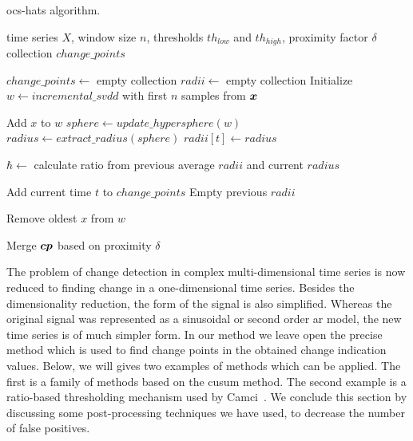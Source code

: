 \begin{algorithm}
\caption{\acrlong{ocs-hats} algorithm.}
\label{alg:ocs-hats}
\begin{algorithmic}[1]
\Require time series $X$, window size $n$, thresholds $th_{low}$ and $th_{high}$, proximity factor $\delta$
\Ensure collection $change\_points$
\item[]
\State $change\_points \leftarrow$ empty collection
\State $radii \leftarrow$ empty collection
\State Initialize $w \leftarrow incremental\_svdd$ with first $n$ samples from $\vectorsym{x}$
\item[]
  \item[]
  \State Add $x$ to $w$
  \State $sphere \leftarrow update\_hypersphere(w)$
  \State $radius \leftarrow extract\_radius(sphere)$
  \State $radii[t] \leftarrow radius$
  \item[]
  \State $\hbar \leftarrow$ calculate ratio from previous average $radii$ and current $radius$
  \item[]
    \State Add current time $t$ to $change\_points$
    \State Empty previous $radii$
  \EndIf
  \item[]
  \State Remove oldest $x$ from $w$
\EndWhile

\item[]

\State Merge $\vectorsym{cp}$ based on proximity $\delta$
\end{algorithmic}
\end{algorithm}

The problem of change detection in complex multi-dimensional time series is now reduced to finding change in a one-dimensional time series.
Besides the dimensionality reduction, the form of the signal is also simplified.
Whereas the original signal was represented as a sinusoidal or second order \gls{ar} model, the new time series is of much simpler form.
In our method we leave open the precise method which is used to find change points in the obtained change indication values.
Below, we will gives two examples of methods which can be applied.
The first is a family of methods based on the \gls{cusum} method.
The second example is a ratio-based thresholding mechanism used by Camci~\cite{camci2010change}.
We conclude this section by discussing some post-processing techniques we have used, to decrease the number of false positives.

